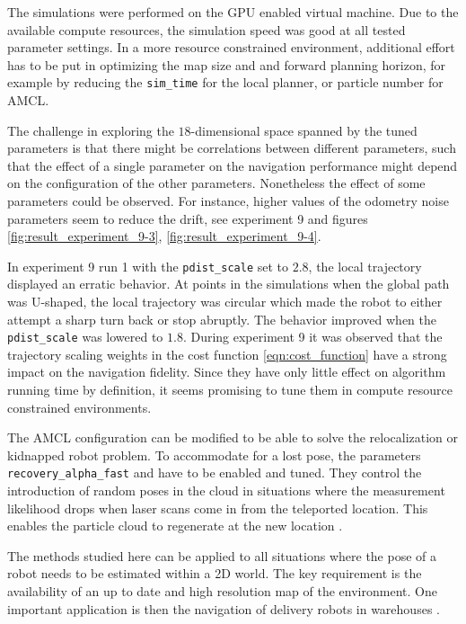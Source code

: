 \documentclass[10pt,journal,compsoc]{IEEEtran}
\begin{document}
The simulations were performed on the GPU enabled virtual machine. Due to the available compute resources, the simulation speed was good at all tested parameter settings. In a more resource constrained environment, additional effort has to be put in optimizing the map size and and forward planning horizon, for example by reducing the \texttt{sim\_time} for the local planner, or particle number for AMCL.

The challenge in exploring the $18$-dimensional space spanned by the tuned parameters is that there might be correlations between different parameters, such that the effect of a single parameter on the navigation performance might depend on the configuration of the other parameters. Nonetheless the effect of some parameters could be observed. For instance, higher values of the odometry noise parameters seem to reduce the drift, see experiment 9 and figures \ref{fig:result_experiment_9-3}, \ref{fig:result_experiment_9-4}.

In experiment 9 run 1 with the \texttt{pdist\_scale} set to $2.8$, the local trajectory displayed an erratic behavior. At points in the simulations when the global path was U-shaped, the local trajectory was circular which made the robot to either attempt a sharp turn back or stop abruptly. The behavior improved when the \texttt{pdist\_scale} was lowered to $1.8$. During experiment 9 it was observed that the trajectory scaling weights in the cost function \ref{eqn:cost_function} have a strong impact on the navigation fidelity. Since they have only little effect on algorithm running time by definition, it seems promising to tune them in compute resource constrained environments.


The AMCL configuration can be modified to be able to solve the relocalization or kidnapped robot problem. To accommodate for a lost pose, the parameters \texttt{recovery\_alpha\_fast} and  have to be enabled and tuned. They control the introduction of random poses in the cloud in situations where the measurement likelihood drops when laser scans come in from the teleported location. This enables the particle cloud to regenerate at the new location \cite{ros_wiki_amcl}.

The methods studied here can be applied to all situations where the pose of a robot needs to be estimated within a 2D world. The key requirement is the availability of an up to date and high resolution map of the environment. One important application is then the navigation of delivery robots in warehouses \cite{warehousing}.
\end{document}

